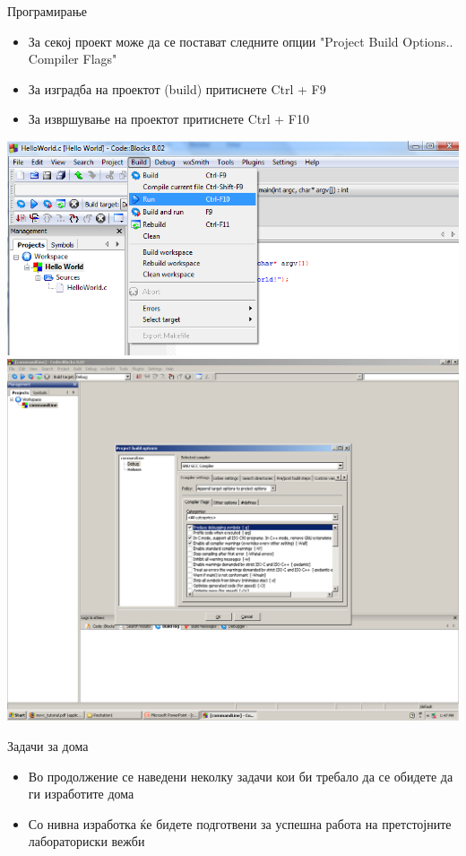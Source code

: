\begin{frame}{Програмирање}
\begin{itemize}
  \item За секој проект може да се постават следните опции "Project  Build Options..
Compiler Flags"
  \item За изградба на проектот (build) притиснете Ctrl + F9 
  \item За извршување на проектот притиснете Ctrl + F10
\end{itemize}
\begin{center}
\includegraphics[scale=0.25]{images/cb_run}
\includegraphics[scale=0.1]{images/cb_flags}
\end{center}
\end{frame}

\begin{frame}{Задачи за дома}
\begin{itemize}
  \item Во продолжение се наведени неколку задачи кои би требало да се обидете
  да ги изработите дома
  \item Со нивна изработка ќе бидете подготвени за успешна работа на
  претстојните лабораториски вежби
\end{itemize}
\end{frame}

